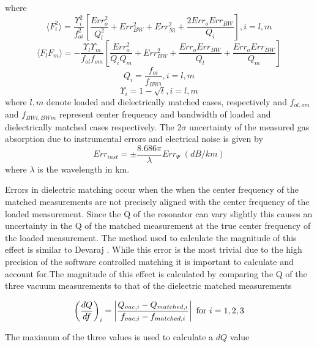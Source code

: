 \noindent where
\begin{equation}
\langle {F_i^2}\rangle = \frac{\Upsilon_i^2}{f_{oi}^2}
\left[ \frac{Err_o^2}{Q_l^2} + Err_{BW}^2 + Err_{Ni}^2 + \frac{2Err_o Err_{BW}}{Q_i} \right], i= l,m
\end{equation}
\begin{equation}
\langle {F_l F_m}\rangle = -\frac{\Upsilon_l \Upsilon_m}{f_{ol} f_{om}}
\left[ \frac{Err_o^2}{Q_i Q_m} + Err_{BW}^2 + \frac{Err_o Err_{BW}}{Q_l} + \frac{Err_o Err_{BW}}{Q_m}\right]
\end{equation}
\begin{equation}
Q_i = \frac{f_{oi}}{f_{BWi}}, i = l,m
\end{equation}
\begin{equation}
\Upsilon_i = 1- \sqrt{t}, i = l,m
\end{equation}
where $l,m$ denote loaded and dielectrically matched cases, respectively and $f_{ol,om}$ and $f_{BWl,BWm}$ represent center frequency and bandwidth of loaded and dielectrically matched cases respectively. The $2\sigma$ uncertainty of the measured gas absorption due to instrumental errors and electrical noise is given by
\begin{equation}
Err_{inst} = \pm \frac{8.686\pi}{\lambda}Err_\Psi\;(dB/km)
\end{equation}
where $\lambda$ is the wavelength in km. 

Errors in dielectric matching occur when the when the center frequency of the matched measurements are not precisely aligned with the center frequency of the loaded measurement. Since the Q of the resonator can vary slightly this causes an uncertainty in the Q of the matched measurement at the true center frequency of the loaded measurement. The method used to calculate the magnitude of this effect is similar to Devaraj \cite{Devaraj-thesis}. While this error is the most trivial due to the high precision of the software controlled matching it is important to calculate and account for.The magnitude of this effect is calculated by comparing the Q of the three vacuum measurements to that of the dielectric matched measurements

\begin{equation}
\left(\frac{dQ}{df} \right)_i = \left|\frac{Q_{vac,i} - Q_{matched,i}}{f_{vac,i} - f_{matched,i}} \right| \textnormal{ for } i = 1,2,3
\end{equation}

The maximum of the three values is used to calculate a $dQ$ value

